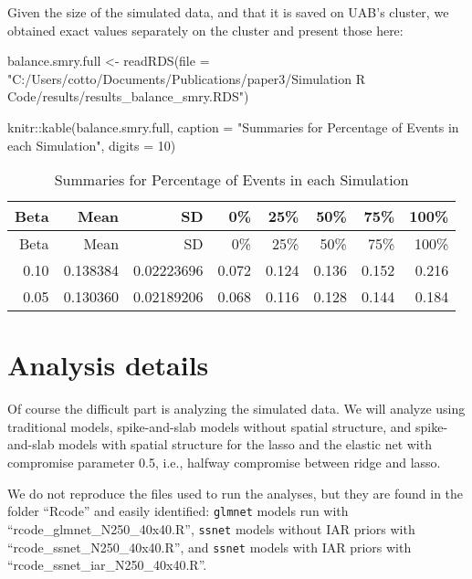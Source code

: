 \documentclass[
]{article}
\newenvironment{Shaded}{\begin{snugshade}}{\end{snugshade}}
\newcommand{\AttributeTok}[1]{\textcolor[rgb]{0.77,0.63,0.00}{#1}}
\newcommand{\DecValTok}[1]{\textcolor[rgb]{0.00,0.00,0.81}{#1}}
\newcommand{\FunctionTok}[1]{\textcolor[rgb]{0.00,0.00,0.00}{#1}}
\newcommand{\NormalTok}[1]{#1}
\newcommand{\OtherTok}[1]{\textcolor[rgb]{0.56,0.35,0.01}{#1}}
\newcommand{\SpecialCharTok}[1]{\textcolor[rgb]{0.00,0.00,0.00}{#1}}
\newcommand{\StringTok}[1]{\textcolor[rgb]{0.31,0.60,0.02}{#1}}
\begin{document}
Given the size of the simulated data, and that it is saved on UAB's
cluster, we obtained exact values separately on the cluster and present
those here:

\begin{Shaded}
\begin{Highlighting}[]
\NormalTok{balance.smry.full }\OtherTok{\textless{}{-}} \FunctionTok{readRDS}\NormalTok{(}\AttributeTok{file =} \StringTok{"C:/Users/cotto/Documents/Publications/paper3/Simulation R Code/results/results\_balance\_smry.RDS"}\NormalTok{)}

\NormalTok{knitr}\SpecialCharTok{::}\FunctionTok{kable}\NormalTok{(balance.smry.full,}
             \AttributeTok{caption =} \StringTok{"Summaries for Percentage of Events in each Simulation"}\NormalTok{,}
             \AttributeTok{digits =} \DecValTok{10}\NormalTok{)}
\end{Highlighting}
\end{Shaded}

\begin{longtable}[]{@{}rrrrrrrr@{}}
\caption{Summaries for Percentage of Events in each
Simulation}\tabularnewline
\toprule
Beta & Mean & SD & 0\% & 25\% & 50\% & 75\% & 100\% \\
\midrule
\endfirsthead
\toprule
Beta & Mean & SD & 0\% & 25\% & 50\% & 75\% & 100\% \\
\midrule
\endhead
0.10 & 0.138384 & 0.02223696 & 0.072 & 0.124 & 0.136 & 0.152 & 0.216 \\
0.05 & 0.130360 & 0.02189206 & 0.068 & 0.116 & 0.128 & 0.144 & 0.184 \\
\bottomrule
\end{longtable}

\hypertarget{analysis-details}{%
\section{Analysis details}\label{analysis-details}}

Of course the difficult part is analyzing the simulated data. We will
analyze using traditional models, spike-and-slab models without spatial
structure, and spike-and-slab models with spatial structure for the
lasso and the elastic net with compromise parameter 0.5, i.e., halfway
compromise between ridge and lasso.

We do not reproduce the files used to run the analyses, but they are
found in the folder ``Rcode'' and easily identified: \texttt{glmnet}
models run with ``rcode\_glmnet\_N250\_40x40.R'', \texttt{ssnet} models
without IAR priors with ``rcode\_ssnet\_N250\_40x40.R'', and
\texttt{ssnet} models with IAR priors with
``rcode\_ssnet\_iar\_N250\_40x40.R''.
\end{document}
